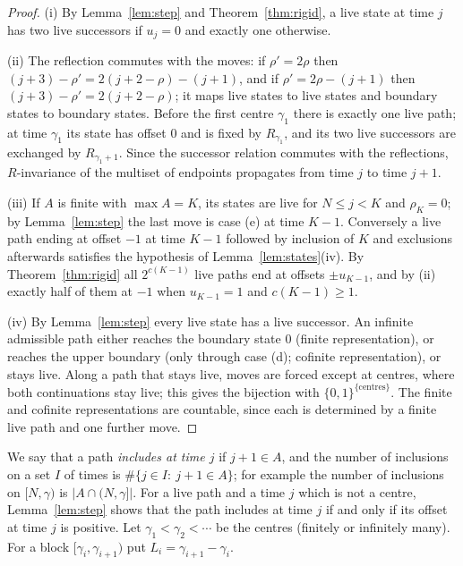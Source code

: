 \documentclass[11pt]{amsart}
\theoremstyle{definition}
\theoremstyle{remark}
\begin{document}
\begin{proof}
(i) By Lemma~\ref{lem:step} and Theorem~\ref{thm:rigid}, a live state at time $j$ has two live successors if $u_j=0$ and exactly one otherwise.

(ii) The reflection commutes with the moves: if $\rho'=2\rho$ then $(j+3)-\rho'=2(j+2-\rho)-(j+1)$, and if $\rho'=2\rho-(j+1)$ then $(j+3)-\rho'=2(j+2-\rho)$; it maps live states to live states and boundary states to boundary states. Before the first centre $\gamma_1$ there is exactly one live path; at time $\gamma_1$ its state has offset $0$ and is fixed by $R_{\gamma_1}$, and its two live successors are exchanged by $R_{\gamma_1+1}$. Since the successor relation commutes with the reflections, $R$-invariance of the multiset of endpoints propagates from time $j$ to time $j+1$.

(iii) If $A$ is finite with $\max A=K$, its states are live for $N\le j<K$ and $\rho_K=0$; by Lemma~\ref{lem:step} the last move is case (e) at time $K-1$. Conversely a live path ending at offset $-1$ at time $K-1$ followed by inclusion of $K$ and exclusions afterwards satisfies the hypothesis of Lemma~\ref{lem:states}(iv). By Theorem~\ref{thm:rigid} all $2^{c(K-1)}$ live paths end at offsets $\pm u_{K-1}$, and by (ii) exactly half of them at $-1$ when $u_{K-1}=1$ and $c(K-1)\ge1$.

(iv) By Lemma~\ref{lem:step} every live state has a live successor. An infinite admissible path either reaches the boundary state $0$ (finite representation), or reaches the upper boundary (only through case (d); cofinite representation), or stays live. Along a path that stays live, moves are forced except at centres, where both continuations stay live; this gives the bijection with $\{0,1\}^{\{\text{centres}\}}$. The finite and cofinite representations are countable, since each is determined by a finite live path and one further move.
\end{proof}

We say that a path \emph{includes at time $j$} if $j+1\in A$, and the number of inclusions on a set $I$ of times is $\#\{j\in I:\ j+1\in A\}$; for example the number of inclusions on $[N,\gamma)$ is $|A\cap(N,\gamma]|$. For a live path and a time $j$ which is not a centre, Lemma~\ref{lem:step} shows that the path includes at time $j$ if and only if its offset at time $j$ is positive. Let $\gamma_1<\gamma_2<\cdots$ be the centres (finitely or infinitely many). For a block $[\gamma_i,\gamma_{i+1})$ put $L_i=\gamma_{i+1}-\gamma_i$.
\end{document}
